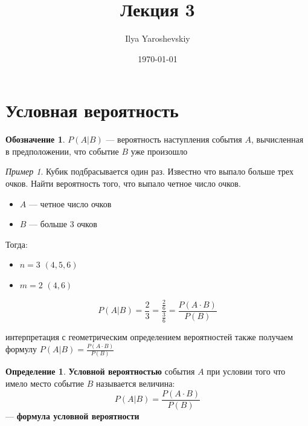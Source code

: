 \documentclass[english]{article}
\author{Ilya Yaroshevskiy}
\date{\today}
\title{Лекция 3}
\theoremstyle{plain}
\theoremstyle{remark}
\newtheorem*{examp}{Пример}
\theoremstyle{definition}
\newtheorem*{definition}{Определение}
\newtheorem*{symb}{Обозначение}
\begin{document}
\maketitle
\tableofcontents


\section{Условная вероятность}
\label{sec:org49b0e5c}
\begin{symb}
\(P(A | B)\) --- вероятность наступления события \(A\), вычисленная в предположении, что событие \(B\) уже произошло
\end{symb}
\begin{examp}
Кубик подбрасывается один раз. Известно что выпало больше трех очков. Найти вероятность того, что выпало четное число очков.
\begin{itemize}
\item \(A\) --- четное число очков
\item \(B\) --- больше 3 очков
\end{itemize}
Тогда:
\begin{itemize}
\item \(n = 3\) \((4, 5, 6)\)
\item \(m = 2\) \((4, 6)\)
\end{itemize}
\[ P(A|B) = \frac{2}{3} = \frac{\frac{2}{6}}{\frac{3}{6}} = \frac{P(A\cdot B)}{P(B)}\]
\end{examp}
 интерпретация с геометрическим определением вероятностей также получаем формулу \(P(A|B) = \frac{P(A\cdot B)}{P(B)}\)
\begin{definition}
\textbf{Условной вероятностью} события \(A\) при условии того что имело место событие \(B\) называется величина:
\[ P(A|B) = \frac{P(A \cdot B)}{P(B)} \] --- \textbf{формула условной вероятности}
\end{definition}
\end{document}
